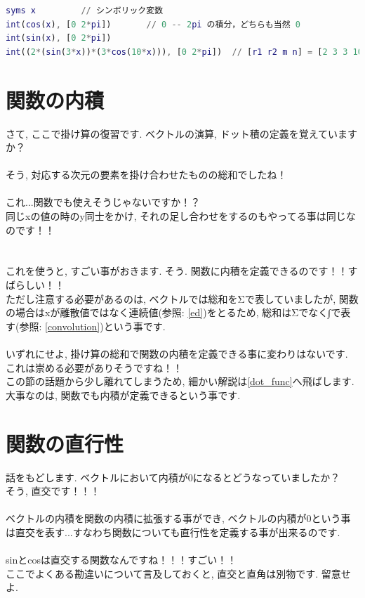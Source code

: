 \documentclass[11pt,a4paper,uplatex]{ujreport}
\begin{document}
\begin{lstlisting}[caption=式(\ref{eq:cosint})あたりのコード,label=sc:cosint, keepspaces=true, language=Matlab]
syms x         // シンボリック変数
int(cos(x), [0 2*pi])       // 0 -- 2pi の積分，どちらも当然 0
int(sin(x), [0 2*pi])
int((2*(sin(3*x))*(3*cos(10*x))), [0 2*pi])  // [r1 r2 m n] = [2 3 3 10] の 0--2pi の積分. これも 0
\end{lstlisting}

\section{関数の内積　\label{dot}}
さて, ここで掛け算の復習です. ベクトルの演算, ドット積の定義を覚えていますか？\\
\\
そう, 対応する次元の要素を掛け合わせたものの総和でしたね！\\
\\
これ...関数でも使えそうじゃないですか！？\\
同じxの値の時のy同士をかけ, それの足し合わせをするのもやってる事は同じなのです！！\\
\\
\\
これを使うと, すごい事がおきます. そう. 関数に内積を定義できるのです！！すばらしい！！\\
ただし注意する必要があるのは, ベクトルでは総和をΣで表していましたが, 関数の場合はxが離散値ではなく連続値(参照: \ref{ed})をとるため, 総和はΣでなく∫で表す(参照: \ref{convolution})という事です.\\
\\
いずれにせよ, 掛け算の総和で関数の内積を定義できる事に変わりはないです. これは崇める必要がありそうですね！！\\
この節の話題から少し離れてしまうため, 細かい解説は\ref{dot_func}へ飛ばします. 大事なのは, 関数でも内積が定義できるという事です.


\section{関数の直行性}
話をもどします. ベクトルにおいて内積が0になるとどうなっていましたか？\\
そう, 直交です！！！\\
\\
ベクトルの内積を関数の内積に拡張する事ができ, ベクトルの内積が0という事は直交を表す...すなわち関数についても直行性を定義する事が出来るのです.\\
\\
sinとcosは直交する関数なんですね！！！すごい！！\\
ここでよくある勘違いについて言及しておくと, 直交と直角は別物です. 留意せよ.
\end{document}
